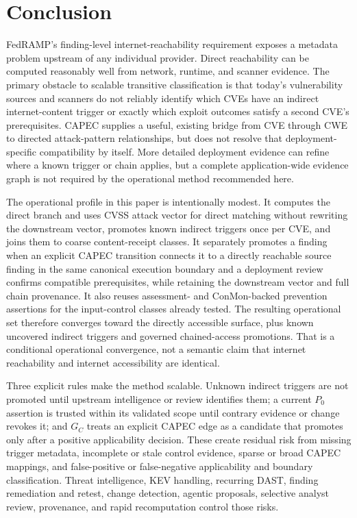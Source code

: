 \documentclass[11pt]{article}
\begin{document}
\section{Conclusion}
FedRAMP's finding-level internet-reachability requirement exposes a metadata
problem upstream of any individual provider. Direct reachability can be
computed reasonably well from network, runtime, and scanner evidence. The
primary obstacle to scalable transitive classification is that today's
vulnerability sources and scanners do not reliably identify which CVEs have an
indirect internet-content trigger or exactly which exploit outcomes satisfy a
second CVE's prerequisites. CAPEC supplies a useful, existing bridge from CVE
through CWE to directed attack-pattern relationships, but does not resolve that
deployment-specific compatibility by itself. More detailed deployment evidence can refine
where a known trigger or chain applies, but a complete application-wide
evidence graph is not required by the operational method recommended here.

The operational profile in this paper is intentionally modest. It computes the
direct branch and uses CVSS attack vector for direct matching without rewriting
the downstream vector, promotes known indirect
triggers once per CVE, and joins them to coarse content-receipt classes. It
separately promotes a finding when an explicit CAPEC transition connects it to
a directly reachable source finding in the same canonical execution boundary
and a deployment review confirms compatible prerequisites, while retaining the
downstream vector and full chain provenance. It
also reuses assessment- and ConMon-backed prevention assertions for the
input-control classes already tested. The resulting operational set therefore
converges toward the directly accessible surface, plus known uncovered indirect
triggers and governed chained-access promotions. That is a conditional
operational convergence, not a semantic claim that internet reachability and
internet accessibility are identical.

Three explicit rules make the method scalable. Unknown indirect triggers
are not promoted until upstream intelligence or review identifies them; a
current $P_0$ assertion is trusted within its validated scope until contrary
evidence or change revokes it; and $G_C$ treats an explicit CAPEC edge as a
candidate that promotes only after a positive applicability decision. These
create residual risk from missing trigger metadata, incomplete or stale control
evidence, sparse or broad CAPEC mappings, and false-positive or false-negative
applicability and boundary classification. Threat intelligence, KEV handling,
recurring DAST, finding remediation and retest, change detection, agentic
proposals, selective analyst review, provenance, and rapid recomputation
control those risks.
\end{document}
